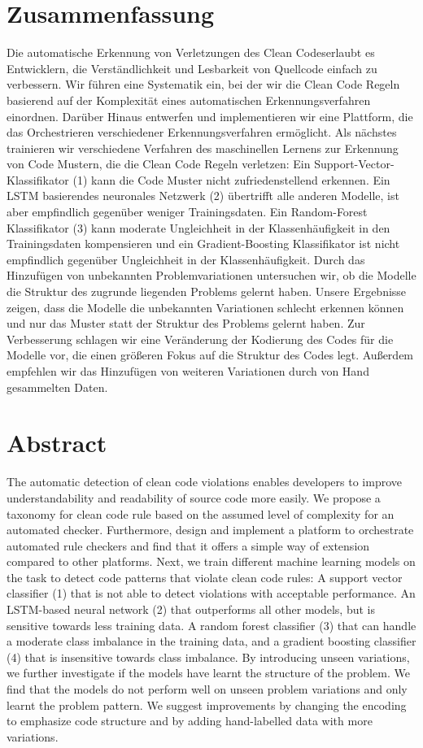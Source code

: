 \section*{Zusammenfassung}

Die automatische Erkennung von Verletzungen des Clean Codeserlaubt es Entwicklern, die Verständlichkeit und Lesbarkeit von Quellcode einfach zu verbessern. Wir führen eine Systematik ein, bei der wir die Clean Code Regeln basierend auf der Komplexität eines automatischen Erkennungsverfahren einordnen. Darüber Hinaus entwerfen und implementieren wir eine Plattform, die das Orchestrieren verschiedener Erkennungsverfahren ermöglicht. Als nächstes trainieren wir verschiedene Verfahren des maschinellen Lernens zur Erkennung von Code Mustern, die die Clean Code Regeln verletzen: Ein Support-Vector-Klassifikator (1) kann die Code Muster nicht zufriedenstellend erkennen. Ein LSTM basierendes neuronales Netzwerk (2) übertrifft alle anderen Modelle, ist aber empfindlich gegenüber weniger Trainingsdaten. Ein Random-Forest Klassifikator (3) kann moderate Ungleichheit in der Klassenhäufigkeit in den Trainingsdaten kompensieren und ein Gradient-Boosting Klassifikator ist nicht empfindlich gegenüber Ungleichheit in der Klassenhäufigkeit. Durch das Hinzufügen von unbekannten Problemvariationen untersuchen wir, ob die Modelle die Struktur des zugrunde liegenden Problems gelernt haben. Unsere Ergebnisse zeigen, dass die Modelle die unbekannten Variationen schlecht erkennen können und nur das Muster statt der Struktur des Problems gelernt haben. Zur Verbesserung schlagen wir eine Veränderung der Kodierung des Codes für die Modelle vor, die einen größeren Fokus auf die Struktur des Codes legt. Außerdem empfehlen wir das Hinzufügen von weiteren Variationen durch von Hand gesammelten Daten.

\newpage
\section*{Abstract}    
The automatic detection of clean code violations enables developers to improve understandability and readability of source code more easily. We propose a taxonomy for clean code rule based on the assumed level of complexity for an automated checker. Furthermore, design and implement a platform to orchestrate automated rule checkers and find that it offers a simple way of extension compared to other platforms. Next, we train different machine learning models on the task to detect code patterns that violate clean code rules: A support vector classifier (1) that is not able to detect violations with acceptable performance. An LSTM-based neural network (2) that outperforms all other models, but is sensitive towards less training data. A random forest classifier (3) that can handle a moderate class imbalance in the training data, and a gradient boosting classifier (4) that is insensitive towards class imbalance. By introducing unseen variations, we further investigate if the models have learnt the structure of the problem. We find that the models do not perform well on unseen problem variations and only learnt the problem pattern. We suggest improvements by changing the encoding to emphasize code structure and by adding hand-labelled data with more variations.